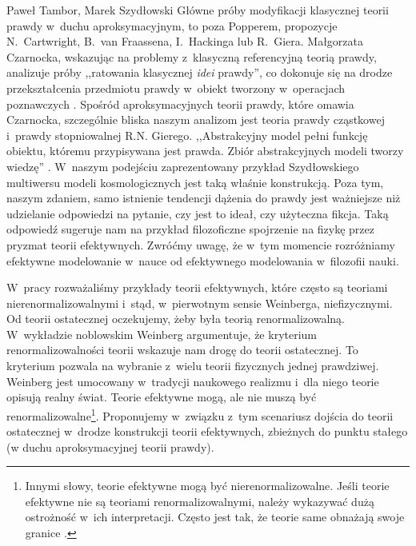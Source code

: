 \begin{artplenv2auth}{Paweł Tambor, Marek Szydłowski}
Główne próby modyfikacji klasycznej teorii prawdy w~duchu aproksymacyjnym, to poza Popperem, propozycje N.~Cartwright, B.~van Fraassena, I.~Hackinga lub R.~Giera. Małgorzata Czarnocka, wskazując na problemy z~klasyczną referencyjną teorią prawdy, analizuje próby ,,ratowania klasycznej \textit{idei} prawdy'', co dokonuje się na drodze przekształcenia przedmiotu prawdy w~obiekt tworzony w~operacjach poznawczych
\parencite[][s.~104]{czarnocka_modyfikacje_1996}. %
 Spośród aproksymacyjnych teorii prawdy, które omawia Czarnocka, szczególnie bliska naszym analizom jest teoria prawdy cząstkowej i~prawdy stopniowalnej R.N. Gierego. ,,Abstrakcyjny model pełni funkcję obiektu, któremu przypisywana jest prawda. Zbiór abstrakcyjnych modeli tworzy wiedzę'' 
\parencite[][s.~110]{czarnocka_modyfikacje_1996}. %
 W~naszym podejściu zaprezentowany przykład Szydłowskiego multiwersu modeli kosmologicznych jest taką właśnie konstrukcją. Poza tym, naszym zdaniem, samo istnienie tendencji dążenia do prawdy jest ważniejsze niż udzielanie odpowiedzi na pytanie, czy jest to ideał, czy użyteczna fikcja. Taką odpowiedź sugeruje nam na przykład filozoficzne spojrzenie na fizykę przez pryzmat teorii efektywnych. Zwróćmy uwagę, że w~tym momencie rozróżniamy efektywne modelowanie w~nauce od efektywnego modelowania w~filozofii nauki.

W~pracy rozważaliśmy przykłady teorii efektywnych, które często są teoriami nierenormalizowalnymi i~stąd, w~pierwotnym sensie Weinberga, niefizycznymi. Od teorii ostatecznej oczekujemy, żeby była teorią renormalizowalną. W~wykładzie noblowskim Weinberg argumentuje, że kryterium renormalizowalności teorii wskazuje nam drogę do teorii ostatecznej. To kryterium pozwala na wybranie z~wielu teorii fizycznych jednej prawdziwej. Weinberg jest umocowany w~tradycji naukowego realizmu i~dla niego teorie opisują realny świat. Teorie efektywne mogą, ale nie muszą być renormalizowalne\footnote{Innymi słowy, teorie efektywne mogą być nierenormalizowalne. Jeśli teorie efektywne nie są teoriami renormalizowalnymi, należy wykazywać dużą ostrożność w~ich interpretacji. Często jest tak, że teorie same obnażają swoje granice
\parencites[][]{golbiak_kosmologia_2005}[][]{butryn_czy_2011}.%
}. Proponujemy w~związku z~tym scenariusz dojścia do teorii ostatecznej w~drodze konstrukcji teorii efektywnych, zbieżnych do punktu stałego (w duchu aproksymacyjnej teorii prawdy).


\end{artplenv2auth}

